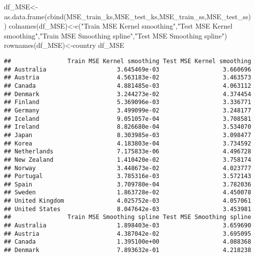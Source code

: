 \documentclass[
]{article}
\newenvironment{Shaded}{\begin{snugshade}}{\end{snugshade}}
\newcommand{\FunctionTok}[1]{\textcolor[rgb]{0.00,0.00,0.00}{#1}}
\newcommand{\NormalTok}[1]{#1}
\newcommand{\OtherTok}[1]{\textcolor[rgb]{0.56,0.35,0.01}{#1}}
\newcommand{\StringTok}[1]{\textcolor[rgb]{0.31,0.60,0.02}{#1}}
\begin{document}
\begin{Shaded}
\begin{Highlighting}[]
\NormalTok{df\_MSE}\OtherTok{\textless{}{-}}\FunctionTok{as.data.frame}\NormalTok{(}\FunctionTok{cbind}\NormalTok{(MSE\_train\_ks,MSE\_test\_ks,MSE\_train\_ss,MSE\_test\_ss))}
\FunctionTok{colnames}\NormalTok{(df\_MSE)}\OtherTok{\textless{}{-}}\FunctionTok{c}\NormalTok{(}\StringTok{"Train MSE Kernel smoothing"}\NormalTok{,}\StringTok{"Test MSE Kernel smoothing"}\NormalTok{,}\StringTok{"Train MSE Smoothing spline"}\NormalTok{,}\StringTok{"Test MSE Smoothing spline"}\NormalTok{)}
\FunctionTok{rownames}\NormalTok{(df\_MSE)}\OtherTok{\textless{}{-}}\NormalTok{country}
\NormalTok{df\_MSE}
\end{Highlighting}
\end{Shaded}

\begin{verbatim}
##                Train MSE Kernel smoothing Test MSE Kernel smoothing
## Australia                    3.645469e-03                  3.660696
## Austria                      4.563183e-02                  3.463573
## Canada                       4.881485e-03                  4.063112
## Denmark                      3.244273e-02                  4.374454
## Finland                      5.369096e-03                  3.336771
## Germany                      3.499099e-02                  3.248177
## Iceland                      9.051057e-04                  3.708581
## Ireland                      8.826680e-04                  3.534070
## Japan                        8.303985e-03                  3.098477
## Korea                        4.183803e-04                  3.734592
## Netherlands                  7.175833e-06                  4.496728
## New Zealand                  1.410420e-02                  3.758174
## Norway                       3.448673e-02                  4.023777
## Portugal                     3.785316e-03                  3.572143
## Spain                        3.709780e-04                  3.782036
## Sweden                       1.863728e-02                  4.450078
## United Kingdom               4.025752e-03                  4.057061
## United States                8.047642e-03                  3.453981
##                Train MSE Smoothing spline Test MSE Smoothing spline
## Australia                    1.898403e-03                  3.659690
## Austria                      4.387042e-02                  3.695095
## Canada                       1.395100e+00                  4.088368
## Denmark                      7.893632e-01                  4.218238

\end{verbatim}
\end{document}

